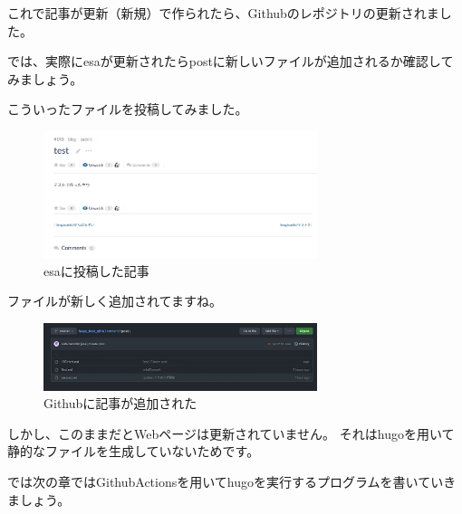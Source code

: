   これで記事が更新（新規）で作られたら、Githubのレポジトリの更新されました。

  では、実際にesaが更新されたらpostに新しいファイルが追加されるか確認してみましょう。

  こういったファイルを投稿してみました。

  \begin{figure}[H]
    \centering
    \includegraphics[width=8cm]{./image/02-chap7/esa-posted.png}
    \caption{esaに投稿した記事 }
    \label{chap7-esa-posted-image}
  \end{figure}

  ファイルが新しく追加されてますね。

  \begin{figure}[H]
    \centering
    \includegraphics[width=8cm]{./image/02-chap7/github-upload-image.png}
    \caption{Githubに記事が追加された }
    \label{chap7-github-upload-image-image}
  \end{figure}

  しかし、このままだとWebページは更新されていません。
  それはhugoを用いて静的なファイルを生成していないためです。

  では次の章ではGithubActionsを用いてhugoを実行するプログラムを書いていきましょう。




  
  
  